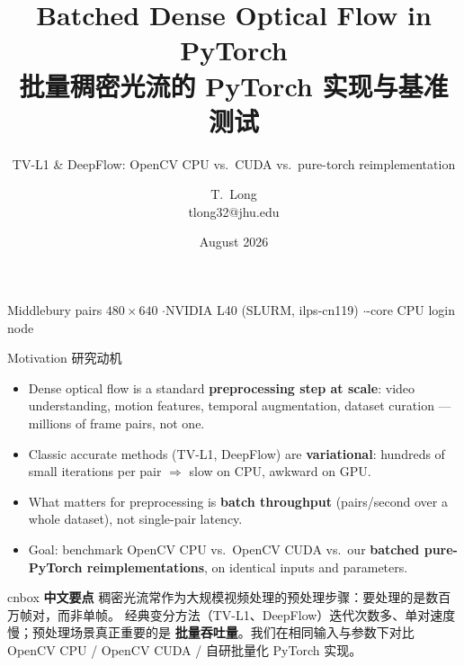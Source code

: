 \documentclass[aspectratio=169,10pt]{beamer}
\title{Batched Dense Optical Flow in PyTorch\\[1ex]
  {\zhfont\large 批量稠密光流的 PyTorch 实现与基准测试}}
\subtitle{TV-L1 \& DeepFlow: OpenCV CPU vs.\ CUDA vs.\ pure-torch reimplementation}
\author{T.~Long \\ {\footnotesize tlong32@jhu.edu}}
\date{August 2026}
\newcommand{\zh}[1]{{\zhfont #1}}
\newenvironment{cn}{%
  \begin{beamercolorbox}[rounded=true,sep=4pt,wd=\textwidth]{cnbox}\zhfont\footnotesize
  {\color{cblue!70!black}\textbf{中文要点}}\quad}%
  {\end{beamercolorbox}}
\begin{document}
\begin{frame}[plain]
  \titlepage
  \vfill
  \centering\scriptsize\color{cmut}
  Middlebury pairs $480\times640$ \quad$\cdot$\quad NVIDIA L40 (SLURM, ilps-cn119)
  \quad$\cdot$-core CPU login node
\end{frame}

\begin{frame}{Motivation \zh{研究动机}}
  \begin{itemize}
    \item Dense optical flow is a standard \textbf{preprocessing step at scale}:
      video understanding, motion features, temporal augmentation, dataset
      curation --- millions of frame pairs, not one.
    \item Classic accurate methods (TV-L1, DeepFlow) are \textbf{variational}:
      hundreds of small iterations per pair $\Rightarrow$ slow on CPU,
      awkward on GPU.
    \item What matters for preprocessing is \textbf{batch throughput}
      (pairs/second over a whole dataset), not single-pair latency.
    \item Goal: benchmark OpenCV CPU vs.\ OpenCV CUDA vs.\ our
      \textbf{batched pure-PyTorch reimplementations}, on identical inputs and
      parameters.
  \end{itemize}
  \vfill
  \begin{cn}
    稠密光流常作为大规模视频处理的预处理步骤：要处理的是数百万帧对，而非单帧。
    经典变分方法（TV-L1、DeepFlow）迭代次数多、单对速度慢；预处理场景真正重要的是
    \textbf{批量吞吐量}。我们在相同输入与参数下对比 OpenCV CPU / OpenCV CUDA /
    自研批量化 PyTorch 实现。
  \end{cn}
\end{frame}
\end{document}
